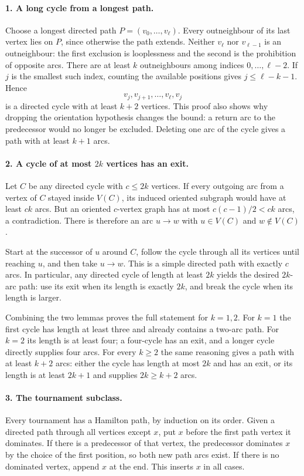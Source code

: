 \documentclass[11pt,a4paper]{article}
\begin{document}
\paragraph{1. A long cycle from a longest path.}
Choose a longest directed path $P=(v_0,\ldots,v_\ell)$. Every
outneighbour of its last vertex lies on $P$, since otherwise the
path extends. Neither $v_\ell$ nor $v_{\ell-1}$ is an outneighbour:
the first exclusion is looplessness and the second is the prohibition
of opposite arcs. There are at least $k$ outneighbours among indices
$0,\ldots,\ell-2$. If $j$ is the smallest such index, counting the
available positions gives $j\le\ell-k-1$. Hence
\[
       v_j,v_{j+1},\ldots,v_\ell,v_j
\]
is a directed cycle with at least $k+2$ vertices. This proof also
shows why dropping the orientation hypothesis changes the bound:
a return arc to the predecessor would no longer be excluded.
Deleting one arc of the cycle gives a path with at least $k+1$ arcs.

\paragraph{2. A cycle of at most $2k$ vertices has an exit.}
Let $C$ be any directed cycle with $c\le2k$ vertices. If every
outgoing arc from a vertex of $C$ stayed inside $V(C)$, its induced
oriented subgraph would have at least $ck$ arcs. But an oriented
$c$-vertex graph has at most $c(c-1)/2<ck$ arcs, a contradiction.
There is therefore an arc $u\to w$ with $u\in V(C)$ and
$w\notin V(C)$.

Start at the successor of $u$ around $C$, follow the cycle through
all its vertices until reaching $u$, and then take $u\to w$.
This is a simple directed path with exactly $c$ arcs. In particular,
any directed cycle of length at least $2k$ yields the desired
$2k$-arc path: use its exit when its length is exactly $2k$, and
break the cycle when its length is larger.

Combining the two lemmas proves the full statement for $k=1,2$.
For $k=1$ the first cycle has length at least three and already
contains a two-arc path. For $k=2$ its length is at least four; a
four-cycle has an exit, and a longer cycle directly supplies four
arcs. For every $k\ge2$ the same reasoning gives a path with at least
$k+2$ arcs: either the cycle has length at most $2k$ and has an exit,
or its length is at least $2k+1$ and supplies $2k\ge k+2$ arcs.

\paragraph{3. The tournament subclass.}
Every tournament has a Hamilton path, by induction on its order.
Given a directed path through all vertices except $x$, put $x$
before the first path vertex it dominates. If there is a predecessor
of that vertex, the predecessor dominates $x$ by the choice of the
first position, so both new path arcs exist. If there is no dominated
vertex, append $x$ at the end. This inserts $x$ in all cases.
\end{document}
